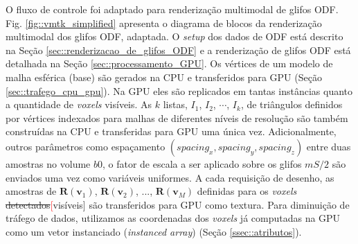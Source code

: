 O fluxo de controle foi adaptado para renderização multimodal de glifos ODF. Fig. \ref{fig::vmtk_simplified} apresenta o diagrama de blocos da renderização multimodal dos glifos ODF, adaptada. O \textit{setup} dos dados de ODF está descrito na Seção \ref{sec::renderizacao_de_glifos_ODF} e a renderização de glifos ODF está detalhada na Seção \ref{sec::processamento_GPU}. Os vértices de um modelo de malha esférica (base) são gerados na CPU e transferidos para GPU (Seção \ref{sec::trafego_cpu_gpu}). Na GPU eles são replicados em tantas instâncias quanto a quantidade de \textit{voxels} visíveis. As $k$ listas, $I_1$, $I_2$, $\cdots$, $I_k$, de triângulos definidos por vértices indexados para malhas de diferentes níveis de resolução são também construídas na CPU e transferidas para GPU uma única vez. Adicionalmente, outros parâmetros como espaçamento $(spacing_x, spacing_y, spacing_z)$ entre duas amostras no volume $b0$, o fator de escala a ser aplicado sobre os glifos $mS/2$ são enviados uma vez como variáveis uniformes. A cada requisição de desenho, as amostras de $\boldsymbol{R}(\mathbf{v}_1)$, $\boldsymbol{R}(\mathbf{v}_2)$, ...,
$\boldsymbol{R}(\mathbf{v}_M)$ definidas para os \textit{voxels} \sout{detectados}\textcolor{red}[visíveis] são transferidos para GPU como textura. Para diminuição de tráfego de dados, utilizamos as coordenadas dos \textit{voxels} já computadas na GPU como um vetor instanciado (\textit{instanced array}) (Seção \ref{ssec::atributos}).






